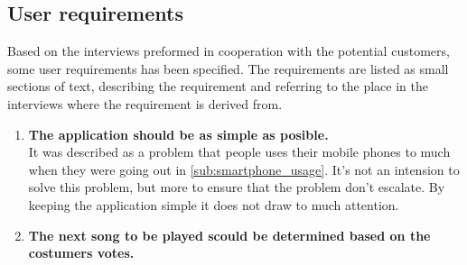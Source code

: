 \subsection{User requirements}
\label{sub:user_requirements}
	
Based on the interviews preformed in cooperation with the potential customers, some user requirements has been specified. The requirements are listed as small sections of text, describing the requirement and referring to the place in the interviews where the requirement is derived from.

\begin{enumerate}
	\item \textbf{The application should be as simple as posible.}\\
		It was described as a problem that people uses their mobile phones to much when they were going out in \cref{sub:smartphone_usage}. It's not an intension to solve this problem, but more to ensure that the problem don't escalate. By keeping the application simple it does not draw to much attention. 
		\item \textbf{The next song to be played scould be determined based on the costumers votes.} \\
					
\end{enumerate}

